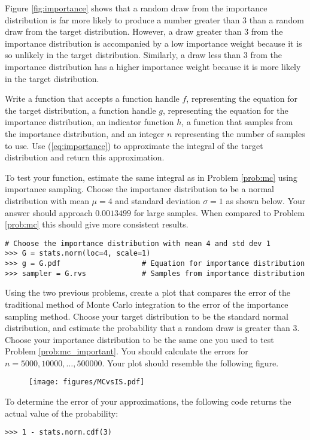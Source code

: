 Figure \ref{fig:importance} shows that a random draw from the importance distribution is far more likely to produce a number greater than 3 than a random draw from the target distribution.
However, a draw greater than 3 from the importance distribution is accompanied by a low importance weight because it is so unlikely in the target distribution.
Similarly, a draw less than 3 from the importance distribution has a higher importance weight because it is more likely in the target distribution.

\begin{problem} \label{prob:mc_important}
Write a function that accepts a function handle $f$, representing the equation for the target distribution, a function handle $g$, representing the equation for the importance distribution, an indicator function $h$, a function that samples from the importance distribution, and an integer $n$ representing the number of samples to use.
Use (\ref{eq:importance}) to approximate the integral of the target distribution and return this approximation.

To test your function, estimate the same integral as in Problem \ref{prob:mc} using importance sampling.
Choose the importance distribution to be a normal distribution with mean $\mu = 4$ and standard deviation $\sigma = 1$ as shown below.
Your answer should approach $0.0013499$ for large samples.
When compared to Problem \ref{prob:mc} this should give more consistent results.

\begin{lstlisting}
# Choose the importance distribution with mean 4 and std dev 1
>>> G = stats.norm(loc=4, scale=1)
>>> g = G.pdf                   # Equation for importance distribution
>>> sampler = G.rvs             # Samples from importance distribution
\end{lstlisting}

\end{problem}

\begin{problem} \label{prob:mc_is_compare}
Using the two previous problems, create a plot that compares the error of the traditional method of Monte Carlo integration to the error of the importance sampling method.
Choose your target distribution to be the standard normal distribution, and estimate the probability that a random draw is greater than $3$.
Choose your importance distribution to be the same one you used to test Problem \ref{prob:mc_important}.
You should calculate the errors for $n = 5000, 10000, \ldots , 500000$.
Your plot should resemble the following figure.

\begin{figure}[H]
\texttt{[image: figures/MCvsIS.pdf]}
\label{fig:compare}
\end{figure}

To determine the error of your approximations, the following code returns the actual value of the probability:
\begin{lstlisting}
>>> 1 - stats.norm.cdf(3)
\end{lstlisting}
\end{problem}


